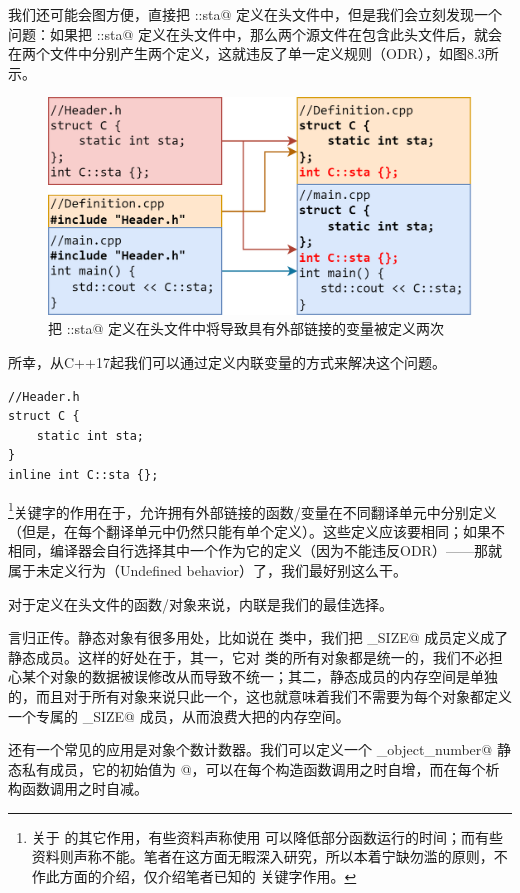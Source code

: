 我们还可能会图方便，直接把 \lstinline@C::sta@ 定义在头文件中，但是我们会立刻发现一个问题：如果把 \lstinline@C::sta@ 定义在头文件中，那么两个源文件在包含此头文件后，就会在两个文件中分别产生两个定义，这就违反了单一定义规则（ODR），如图8.3所示。\par
\begin{figure}[htbp]
    \centering
    \includegraphics[width=.8\textwidth]{../images/generalized_parts/08_file_inclusion_300.png}
    \caption{把 \lstinline@C::sta@ 定义在头文件中将导致具有外部链接的变量被定义两次}
\end{figure}
所幸，从C++17起我们可以通过定义内联变量的方式来解决这个问题。
\begin{lstlisting}
//Header.h
struct C {
    static int sta;
}
inline int C::sta {};
\end{lstlisting}
\lstinline@inline@\footnote{关于 \lstinline@inline@ 的其它作用，有些资料声称使用 \lstinline@inline@ 可以降低部分函数运行的时间；而有些资料则声称不能。笔者在这方面无睱深入研究，所以本着宁缺勿滥的原则，不作此方面的介绍，仅介绍笔者已知的 \lstinline@inline@ 关键字作用。}关键字的作用在于，允许拥有外部链接的函数/变量在不同翻译单元中分别定义（但是，在每个翻译单元中仍然只能有单个定义）。这些定义应该要相同；如果不相同，编译器会自行选择其中一个作为它的定义（因为不能违反ODR）——那就属于未定义行为（Undefined behavior）了，我们最好别这么干。\par
对于定义在头文件的函数/对象来说，内联是我们的最佳选择。\par
言归正传。静态对象有很多用处，比如说在 \lstinline@valarray@ 类中，我们把 \lstinline@MAX_SIZE@ 成员定义成了静态成员。这样的好处在于，其一，它对 \lstinline@valarri@ 类的所有对象都是统一的，我们不必担心某个对象的数据被误修改从而导致不统一；其二，静态成员的内存空间是单独的，而且对于所有对象来说只此一个，这也就意味着我们不需要为每个对象都定义一个专属的 \lstinline@MAX_SIZE@ 成员，从而浪费大把的内存空间。\par
还有一个常见的应用是对象个数计数器。我们可以定义一个 \lstinline@_object_number@ 静态私有成员，它的初始值为 @，可以在每个构造函数调用之时自增，而在每个析构函数调用之时自减。
